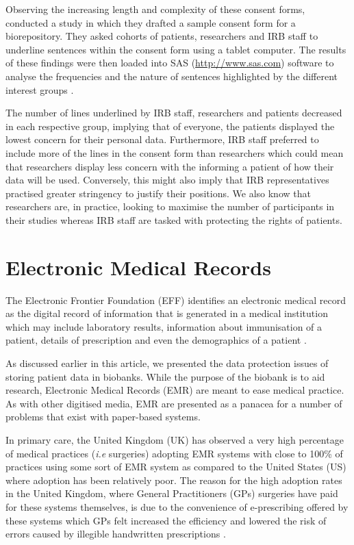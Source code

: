 \documentclass[british,a4paper, 12pt]{article}
\begin{document}
Observing the increasing length and complexity of these consent forms,
\citeauthor*{beskow2010simplifyinog} conducted a study in which they drafted a sample consent form
for a biorepository. They asked cohorts of patients, researchers and IRB staff to underline
sentences within the consent form using a tablet computer. The results of these findings were
then loaded into SAS (\url{http://www.sas.com}) software to analyse the frequencies and the nature
of sentences highlighted by the different interest groups \parencite{beskow2010simplifyinog}.

The number of lines underlined by IRB staff, researchers and patients decreased in
each respective group, implying that of everyone, the patients displayed the lowest concern for
their personal data. Furthermore, IRB staff preferred to include more of the lines in the
consent form than researchers which could mean that researchers display less concern with the
informing a patient of how their data will be used. Conversely, this might also imply that IRB
representatives practised greater stringency to justify their positions. We also know that
researchers are, in practice, looking to maximise the number of participants in their studies
whereas IRB staff are tasked with protecting the rights of patients.

\section{Electronic Medical Records}
The Electronic Frontier Foundation (EFF) identifies an electronic medical record as
the digital record of information that is generated in a medical institution which may
include laboratory results, information about immunisation of a patient,
details of prescription and even the demographics of a patient
\parencite{effemrdefinition}.

As discussed earlier in this article, we presented the data protection issues of storing
patient data in biobanks. While the purpose of the biobank is to aid research, Electronic
Medical Records (EMR) are meant to ease medical practice. As with other digitised media,
EMR are presented as a panacea for a number of problems that exist with paper-based
systems.

In primary care, the United Kingdom (UK) has observed a very high percentage
of medical practices (\emph{i.e} surgeries) adopting EMR systems with close to 100\% of practices using some sort
of EMR system as compared to the United States (US) where adoption has been relatively poor.
The reason for the high adoption rates in the United Kingdom, where General Practitioners (GPs)
surgeries have paid for these systems themselves, is due to the convenience of e-prescribing
offered by these systems which GPs felt increased the efficiency and lowered the risk of
errors caused by illegible handwritten prescriptions \parencite{schade2006prescribing}.
\end{document}

